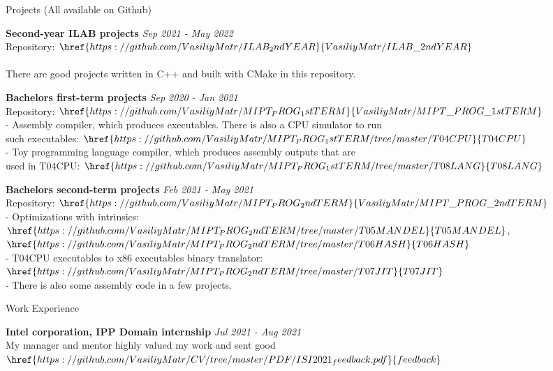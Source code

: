 \documentclass{resume} %
\begin{document}
\begin{rSection}{Projects (All available on Github)}

{\bf Second-year ILAB projects} \hfill {\em Sep 2021 - May 2022}
\\ {Repository: $\href {https://github.com/VasiliyMatr/ILAB_2ndYEAR}
    {VasiliyMatr/ILAB\_2ndYEAR}$}
\\
\\ There are good projects written in C++ and built with CMake in this repository.

{\bf Bachelors first-term projects} \hfill {\em Sep 2020 - Jan 2021}
\\ Repository: $\href {https://github.com/VasiliyMatr/MIPT_PROG_1stTERM}
    {VasiliyMatr/MIPT\_PROG\_1stTERM}$
\\- Assembly compiler, which produces executables. There is also a CPU simulator to run \\
    such executables:
    $\href {https://github.com/VasiliyMatr/MIPT_PROG_1stTERM/tree/master/T04CPU}{T04CPU}$
\\- Toy programming language compiler, which produces assembly outputs that are  \\
    used in T04CPU:
    $\href {https://github.com/VasiliyMatr/MIPT_PROG_1stTERM/tree/master/T08LANG}{T08LANG}$


{\bf Bachelors second-term projects} \hfill {\em Feb 2021 - May 2021}
\\ Repository: $\href {https://github.com/VasiliyMatr/MIPT_PROG_2ndTERM}
    {VasiliyMatr/MIPT\_PROG\_2ndTERM}$
\\- Optimizations with intrinsics:
    $\href {https://github.com/VasiliyMatr/MIPT_PROG_2ndTERM/tree/master/T05MANDEL}{T05MANDEL}$,
    $\href {https://github.com/VasiliyMatr/MIPT_PROG_2ndTERM/tree/master/T06HASH}{T06HASH}$
\\- T04CPU executables to x86 executables binary translator:
    $\href {https://github.com/VasiliyMatr/MIPT_PROG_2ndTERM/tree/master/T07JIT}{T07JIT}$
\\- There is also some assembly code in a few projects.
\end{rSection}

\begin{rSection}{Work Experience}

{\bf Intel corporation, IPP Domain internship} \hfill {\em Jul 2021 - Aug 2021}
\\ My manager and mentor highly valued my work and sent good
    $\href {https://github.com/VasiliyMatr/CV/tree/master/PDF/ISI2021_feedback.pdf}{feedback}$

\end{rSection}
\end{document}
